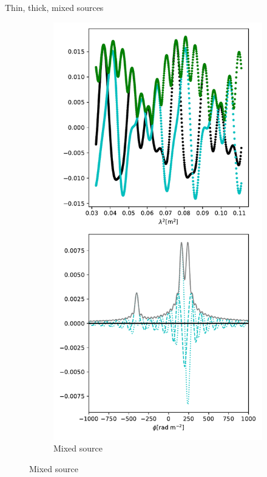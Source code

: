 \documentclass[xetex,aspectratio=169]{beamer}
\begin{document}
\begin{frame}{Thin, thick, mixed sources}
\begin{figure}
\begin{subfigure}{0.2\textwidth}
		\end{subfigure}
		\begin{subfigure}{0.2\textwidth}
			\includegraphics[width=\textwidth]{figures/sources/mixed_source.pdf}
			\caption{Mixed source}
		\end{subfigure}
	\end{figure}

\end{frame}
\end{document}
